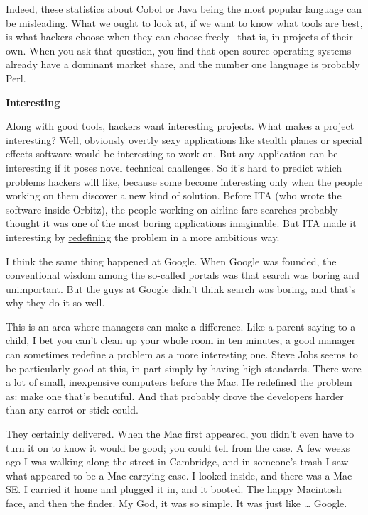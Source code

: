 Indeed, these statistics about Cobol or Java being the most popular
language can be misleading. What we ought to look at, if we want to know
what tools are best, is what hackers choose when they can choose
freely-- that is, in projects of their own. When you ask that question,
you find that open source operating systems already have a dominant
market share, and the number one language is probably Perl.

\textbf{Interesting}

Along with good tools, hackers want interesting projects. What makes a
project interesting? Well, obviously overtly sexy applications like
stealth planes or special effects software would be interesting to work
on. But any application can be interesting if it poses novel technical
challenges. So it's hard to predict which problems hackers will like,
because some become interesting only when the people working on them
discover a new kind of solution. Before ITA (who wrote the software
inside Orbitz), the people working on airline fare searches probably
thought it was one of the most boring applications imaginable. But ITA
made it interesting by \href{carl.html}{redefining} the problem in a
more ambitious way.

I think the same thing happened at Google. When Google was founded, the
conventional wisdom among the so-called portals was that search was
boring and unimportant. But the guys at Google didn't think search was
boring, and that's why they do it so well.

This is an area where managers can make a difference. Like a parent
saying to a child, I bet you can't clean up your whole room in ten
minutes, a good manager can sometimes redefine a problem as a more
interesting one. Steve Jobs seems to be particularly good at this, in
part simply by having high standards. There were a lot of small,
inexpensive computers before the Mac. He redefined the problem as: make
one that's beautiful. And that probably drove the developers harder than
any carrot or stick could.

They certainly delivered. When the Mac first appeared, you didn't even
have to turn it on to know it would be good; you could tell from the
case. A few weeks ago I was walking along the street in Cambridge, and
in someone's trash I saw what appeared to be a Mac carrying case. I
looked inside, and there was a Mac SE. I carried it home and plugged it
in, and it booted. The happy Macintosh face, and then the finder. My
God, it was so simple. It was just like \ldots{} Google.

